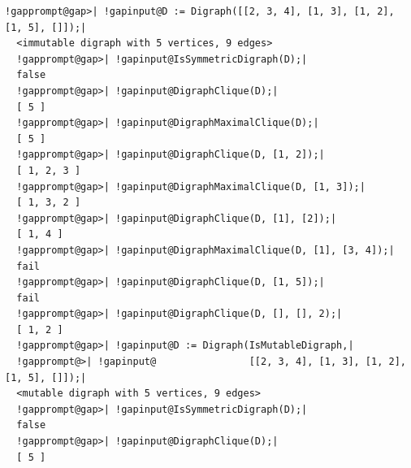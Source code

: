 \documentclass[a4paper,11pt]{report}
\begin{document}
{{{\begin{Verbatim}[commandchars=!@|,fontsize=\small,frame=single,label=Example]
  !gapprompt@gap>| !gapinput@D := Digraph([[2, 3, 4], [1, 3], [1, 2], [1, 5], []]);|
  <immutable digraph with 5 vertices, 9 edges>
  !gapprompt@gap>| !gapinput@IsSymmetricDigraph(D);|
  false
  !gapprompt@gap>| !gapinput@DigraphClique(D);|
  [ 5 ]
  !gapprompt@gap>| !gapinput@DigraphMaximalClique(D);|
  [ 5 ]
  !gapprompt@gap>| !gapinput@DigraphClique(D, [1, 2]);|
  [ 1, 2, 3 ]
  !gapprompt@gap>| !gapinput@DigraphMaximalClique(D, [1, 3]);|
  [ 1, 3, 2 ]
  !gapprompt@gap>| !gapinput@DigraphClique(D, [1], [2]);|
  [ 1, 4 ]
  !gapprompt@gap>| !gapinput@DigraphMaximalClique(D, [1], [3, 4]);|
  fail
  !gapprompt@gap>| !gapinput@DigraphClique(D, [1, 5]);|
  fail
  !gapprompt@gap>| !gapinput@DigraphClique(D, [], [], 2);|
  [ 1, 2 ]
  !gapprompt@gap>| !gapinput@D := Digraph(IsMutableDigraph,|
  !gapprompt@>| !gapinput@                [[2, 3, 4], [1, 3], [1, 2], [1, 5], []]);|
  <mutable digraph with 5 vertices, 9 edges>
  !gapprompt@gap>| !gapinput@IsSymmetricDigraph(D);|
  false
  !gapprompt@gap>| !gapinput@DigraphClique(D);|
  [ 5 ]
\end{Verbatim}
 }

 

}}
\end{document}
